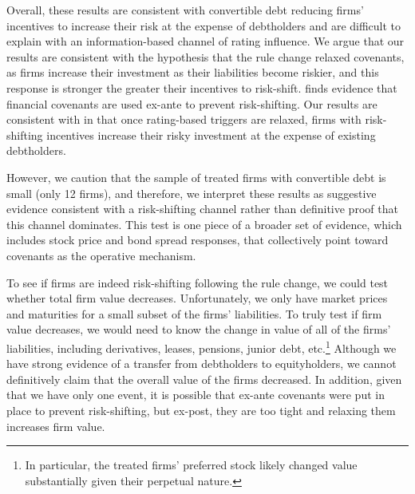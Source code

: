 \documentclass[a4paper, 12pt]{article}
\begin{document}
Overall, these results are consistent with convertible debt reducing firms' incentives to increase their risk at the expense of debtholders and are difficult to explain with an information-based channel of rating influence. We argue that our results are consistent with the hypothesis that the rule change relaxed covenants, as firms increase their investment as their liabilities become riskier, and this response is stronger the greater their incentives to risk-shift. \cite{gilje2016firms} finds evidence that financial covenants are used ex-ante to prevent risk-shifting. Our results are consistent with \cite{gilje2016firms} in that once rating-based triggers are relaxed, firms with risk-shifting incentives increase their risky investment at the expense of existing debtholders.

However, we caution that the sample of treated firms with convertible debt is small (only 12 firms), and therefore, we interpret these results as suggestive evidence consistent with a risk-shifting channel rather than definitive proof that this channel dominates. This test is one piece of a broader set of evidence, which includes stock price and bond spread responses, that collectively point toward covenants as the operative mechanism.


To see if firms are indeed risk-shifting following the rule change, we could test whether total firm value decreases. Unfortunately, we only have market prices and maturities for a small subset of the firms' liabilities. To truly test if firm value decreases, we would need to know the change in value of all of the firms' liabilities, including derivatives, leases, pensions, junior debt, etc.\footnote{In particular, the treated firms' preferred stock likely changed value substantially given their perpetual nature.}  Although we have strong evidence of a transfer from debtholders to equityholders, we cannot definitively claim that the overall value of the firms decreased. In addition, given that we have only one event, it is possible that ex-ante covenants were put in place to prevent risk-shifting, but ex-post, they are too tight and relaxing them increases firm value.
\end{document}
